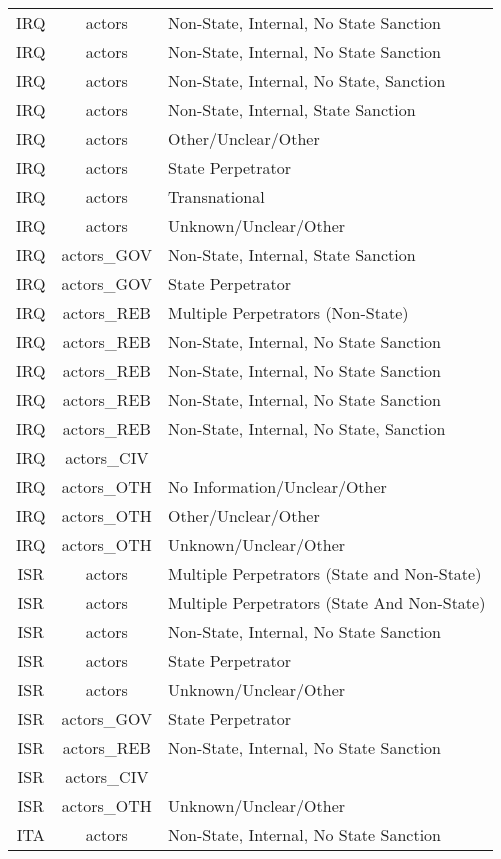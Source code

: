 \documentclass[12pt]{article}
\begin{document}
\begin{center}
\begin{longtable}{|c|c|p{10cm}|}
  IRQ & actors & Non-State, Internal, No State Sanction \\ 
  IRQ & actors & Non-State, Internal, No State Sanction \\ 
  IRQ & actors & Non-State, Internal, No State, Sanction \\ 
  IRQ & actors & Non-State, Internal, State Sanction \\ 
  IRQ & actors & Other/Unclear/Other \\ 
  IRQ & actors & State Perpetrator \\ 
  IRQ & actors & Transnational \\ 
  IRQ & actors & Unknown/Unclear/Other \\ 
  IRQ & actors\_GOV & Non-State, Internal, State Sanction \\ 
  IRQ & actors\_GOV & State Perpetrator \\ 
  IRQ & actors\_REB & Multiple Perpetrators (Non-State) \\ 
  IRQ & actors\_REB & Non-State, Internal,  No State Sanction \\ 
  IRQ & actors\_REB & Non-State, Internal, No State Sanction \\ 
  IRQ & actors\_REB & Non-State, Internal, No State Sanction \\ 
  IRQ & actors\_REB & Non-State, Internal, No State, Sanction \\ 
  IRQ & actors\_CIV &  \\ 
  IRQ & actors\_OTH & No Information/Unclear/Other \\ 
  IRQ & actors\_OTH & Other/Unclear/Other \\ 
  IRQ & actors\_OTH & Unknown/Unclear/Other \\ 
  ISR & actors & Multiple Perpetrators (State and Non-State) \\ 
  ISR & actors & Multiple Perpetrators (State And Non-State) \\ 
  ISR & actors & Non-State, Internal, No State Sanction \\ 
  ISR & actors & State Perpetrator \\ 
  ISR & actors & Unknown/Unclear/Other \\ 
  ISR & actors\_GOV & State Perpetrator \\ 
  ISR & actors\_REB & Non-State, Internal, No State Sanction \\ 
  ISR & actors\_CIV &  \\ 
  ISR & actors\_OTH & Unknown/Unclear/Other \\ 
  ITA & actors & Non-State, Internal, No State Sanction \\ 

\end{longtable}
\end{center}
\end{document}
